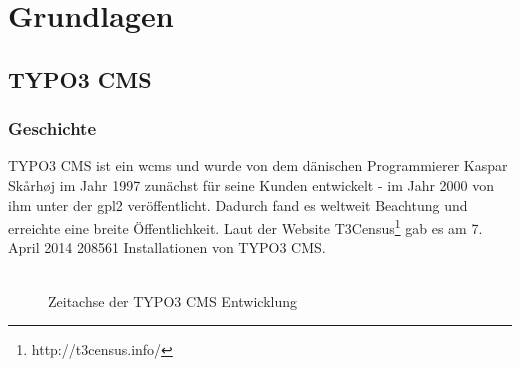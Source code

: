 \chapter{Grundlagen}
\label{ch:basics}



\section{TYPO3 CMS}
\label{sec:typo3cms}
\subsection{Geschichte}
\label{subsec:historyTypo3}
TYPO3 CMS ist ein \gls{wcms} und wurde von dem dänischen Programmierer Kaspar Skårhøj im Jahr 1997 zunächst für seine Kunden entwickelt - im Jahr 2000 von ihm unter der \gls{gpl2} veröffentlicht. Dadurch fand es weltweit Beachtung und erreichte eine breite Öffentlichkeit. Laut der Website T3Census\footnote{http://t3census.info/} gab es am 7. April 2014 208561 Installationen von TYPO3 CMS.
\\
\\
\begin{figure}[h!]
	\startchronology[startyear=1995, stopyear=2015]
	\stopchronology
	\caption{Zeitachse der TYPO3 CMS Entwicklung}
\end{figure}

